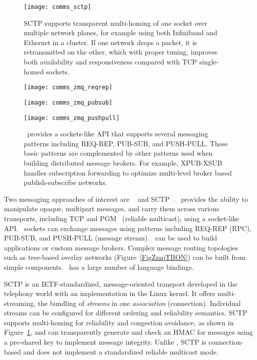 \begin{figure}
\centering
\texttt{[image: comms\_sctp]}
\caption{SCTP supports transparent multi-homing of one socket over multiple
network planes, for example using both Infiniband and Ethernet in a cluster.
If one network drops a packet, it is retransmitted on the other, which with
proper tuning, improves both availability and responsiveness compared with
TCP single-homed sockets.}
\label{FigCommsSCTP}
\end{figure}

\begin{figure}
\begin{minipage}[b]{0.15\linewidth}
\texttt{[image: comms\_zmq\_reqrep]}
\end{minipage}
\hspace{0.5cm}
\begin{minipage}[b]{0.4\linewidth}
\texttt{[image: comms\_zmq\_pubsub]}
\end{minipage}
\hspace{0.5cm}
\begin{minipage}[b]{0.4\linewidth}
\texttt{[image: comms\_zmq\_pushpull]}
\end{minipage}
\caption{\zMQ\ provides a sockets-like API that supports several
messaging patterns including REQ-REP, PUB-SUB, and PUSH-PULL.
These basic patterns are complemented by other patterns used when
building distributed message brokers.  For example, XPUB-XSUB handles
subscription forwarding to optimize multi-level broker based
publish-subscribe networks.}
\label{FigCommsZmq}
\end{figure}

Two messaging approaches of interest are \zMQ~\cite{ZMQGuide} and
SCTP~\cite{SCTP}.
\zMQ\ provides the ability to manipulate opaque, multipart messages,
and carry them across various transports, including TCP and
PGM~\cite{rfc3208} (reliable multicast), using a socket-like API.
\zMQ\ sockets can exchange messages using patterns including
REQ-REP (RPC), PUB-SUB, and PUSH-PULL (message stream).
\zMQ\ can be used to build applications or custom message brokers.
Complex message routing topologies such as tree-based overlay networks
(Figure~\ref{FigZmqTBON}) can be built from simple components.
\zMQ\ has a large number of language bindings.

SCTP is an IETF-standardized, message-oriented transport developed
in the telephony world with an implementation in the Linux kernel.
It offers multi-streaming, the bundling of {\em streams} in one
{\em association} (connection).  Individual streams can be configured for
different ordering and reliability semantics.  SCTP supports
multi-homing for reliability and congestion avoidance, as shown in
Figure~\ref{FigCommsSCTP}, and
can transparently generate and check an HMAC for messages using a
pre-shared key to implement message integrity.  Unlike \zMQ, SCTP is
connection-based and does not implement a standardized reliable multicast
mode.

